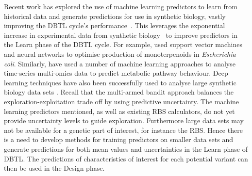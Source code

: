 \documentclass{article}
\begin{document}
Recent work has explored the use of machine learning predictors to learn
from historical data and generate predictions for use in synthetic biology,
vastly improving the DBTL cycle's performance~\cite{Camacho2018,Radivojevic2020,LAWSON2021}.
This leverages the exponential increase in experimental data from synthetic biology~\cite{Freemont2019}
to improve predictors in the Learn phase of the DBTL cycle.
For example, \textcite{Jervis2019} used support vector machines and neural networks to optimise production of monoterpenoids in \emph{Escherichia coli}.
Similarly, \textcite{Costello2018} have used a number of machine learning approaches to analyse time-series multi-omics data to predict metabolic pathway behaviour.
Deep learning techniques have also been successfully used to analyse large synthetic biology data sets \cite{Alipanahi2015,Angermueller2016,Hollerer2020}.
Recall that the multi-armed bandit approach balances the exploration-exploitation
trade off by using predictive uncertainty. The machine learning predictors
mentioned, as well as existing RBS calculators,
do not yet provide uncertainty levels to guide exploration.
Furthermore large data sets may not be available for a genetic part of interest, for instance the RBS.
Hence there is a need to develop methods for training predictors on smaller data sets and generate predictions for both mean values and uncertainties in the Learn phase of DBTL. The predictions of characteristics of interest for
each potential variant
can then be used in the Design phase.
\\
\end{document}
